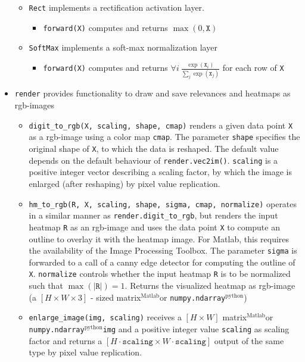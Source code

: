 \documentclass[a4wide]{article}
\newcommand{\mat}{$^\text{Matlab}$}
\newcommand{\py}{$^\text{python}$}
\begin{document}
\begin{itemize}
\begin{itemize}
		\item \texttt{Rect} implements a rectification activation layer.
			\begin{itemize}
				\item \texttt{forward(X)} computes and returns $\max(0,\texttt{X})$
			\end{itemize}	
				
		\item \texttt{SoftMax} implements a soft-max normalization layer
			\begin{itemize}
				\item \texttt{forward(X)} computes and returns $\forall i ~ \frac{\exp(\texttt{X}_i)}{\sum_j \exp(\texttt{X}_j)}$ for each row of \texttt{X}
			\end{itemize}		
	\end{itemize}
\item \texttt{render} provides functionality to draw and save relevances and heatmaps as rgb-images
	\begin{itemize}
		\item \texttt{digit\_to\_rgb(X, scaling, shape, cmap)} renders a given data point \texttt{X} as a rgb-image using a color map \texttt{cmap}. The parameter \texttt{shape} specifies the original shape of \texttt{X}, to which the data is reshaped. The default value depends on the default behaviour of \texttt{render.vec2im()}. \texttt{scaling} is a positive integer vector describing a scaling factor, by which the image is enlarged (after reshaping) by pixel value replication.
		\item \texttt{hm\_to\_rgb(R, X, scaling, shape, sigma, cmap, normalize)} operates in a similar manner as \texttt{render.digit\_to\_rgb}, but renders the input heatmap \texttt{R} as an rgb-image and uses the data point \texttt{X} to compute an outline to overlay it with the heatmap image. For Matlab, this requires the availability of the Image Processing Toolbox. The parameter \texttt{sigma} is forwarded to a call of a canny edge detector for computing the outline of \texttt{X}. \texttt{normalize} controls whether the input heatmap \texttt{R} is to be normalized such that $\max(|\texttt{R}|) = 1$. Returns the visualized heatmap as rgb-image (a $[H \times W \times 3]$ - sized matrix\mat or \texttt{numpy.ndarray}\py)
		\item \texttt{enlarge\_image(img, scaling)} receives a $[H \times W]$ matrix\mat or \texttt{numpy.ndarray}\py \texttt{img} and a positive integer value \texttt{scaling} as scaling factor and returns a $[H\cdot\texttt{scaling} \times W\cdot\texttt{scaling}]$ output of the same type by pixel value replication.

\end{itemize}
\end{itemize}
\end{document}
